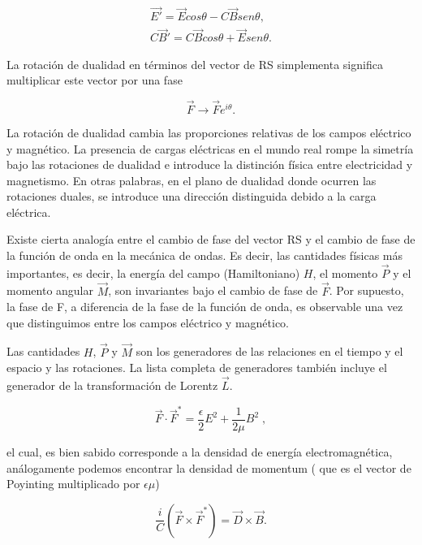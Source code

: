             \begin{align}
                \Vec{E'} = \Vec{E}cos\theta - C\Vec{B}sen\theta,\\
                C\Vec{B}' = C\Vec{B}cos\theta + \Vec{E}sen\theta.
            \end{align}

            La rotación de dualidad en términos del vector de RS simplementa significa multiplicar este vector por una fase

            \begin{equation}
                \Vec{F} \rightarrow \Vec{F}e^{i\theta}.
            \end{equation}

            La rotación de dualidad cambia las proporciones relativas de los campos eléctrico y magnético. La presencia de cargas eléctricas en el mundo real rompe la simetría bajo las rotaciones de dualidad e introduce la distinción física entre electricidad y magnetismo. En otras palabras, en el plano de dualidad donde ocurren las rotaciones duales, se introduce una dirección distinguida debido a la carga eléctrica.

            Existe cierta analogía entre el cambio de fase del vector RS y el cambio de fase de la función de onda en la mecánica de ondas. Es decir, las cantidades físicas más importantes, es decir, la energía del campo (Hamiltoniano) $H$, el momento $\Vec{P}$ y el momento angular $\Vec{M}$, son invariantes bajo el cambio de fase de $\Vec{F}$. Por supuesto, la fase de F, a diferencia de la fase de la función de onda, es observable una vez que distinguimos entre los campos eléctrico y magnético.

            Las cantidades $H$, $\Vec{P}$ y $\Vec{M}$ son los generadores de las relaciones en el tiempo y el espacio y las rotaciones. La lista completa de generadores también incluye el generador de la transformación de Lorentz $\Vec{L}$.

            \begin{equation}
                \Vec{F}\cdot \Vec{F}^* = \frac{\epsilon}{2}E^2 + \frac{1}{2\mu}B^2\;,
            \end{equation}

            el cual, es bien sabido corresponde a la densidad de energía electromagnética, análogamente podemos encontrar la densidad de momentum ( que es el vector de Poyinting multiplicado por $\epsilon\mu$)

            \begin{equation}
                \frac{i}{C}\left( \Vec{F} \times \Vec{F}^*\right) =  \Vec{D}\times \Vec{B}.
            \end{equation}

